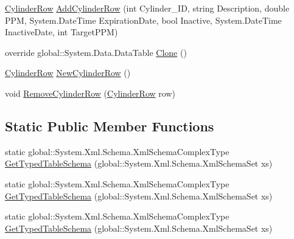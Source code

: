 \begin{DoxyCompactItemize}
\hyperlink{class_env_int_1_1_win32_1_1_field_tech_1_1_manager_1_1_data_sets_1_1_guide_ware_mobile_data_set_1_1_cylinder_row}{Cylinder\+Row} \hyperlink{class_env_int_1_1_win32_1_1_field_tech_1_1_manager_1_1_data_sets_1_1_guide_ware_mobile_data_set_1_1_cylinder_data_table_aaec1ad7d2eb796c3c432c67cb15d6db7}{Add\+Cylinder\+Row} (int Cylinder\+\_\+\+I\+D, string Description, double P\+P\+M, System.\+Date\+Time Expiration\+Date, bool Inactive, System.\+Date\+Time Inactive\+Date, int Target\+P\+P\+M)
\item 
override global\+::\+System.\+Data.\+Data\+Table \hyperlink{class_env_int_1_1_win32_1_1_field_tech_1_1_manager_1_1_data_sets_1_1_guide_ware_mobile_data_set_1_1_cylinder_data_table_acc28d7467e204bb522f9e37fc3654dd5}{Clone} ()
\item 
\hyperlink{class_env_int_1_1_win32_1_1_field_tech_1_1_manager_1_1_data_sets_1_1_guide_ware_mobile_data_set_1_1_cylinder_row}{Cylinder\+Row} \hyperlink{class_env_int_1_1_win32_1_1_field_tech_1_1_manager_1_1_data_sets_1_1_guide_ware_mobile_data_set_1_1_cylinder_data_table_aa16fd02d3df499f1b8f444e0e36027bf}{New\+Cylinder\+Row} ()
\item 
void \hyperlink{class_env_int_1_1_win32_1_1_field_tech_1_1_manager_1_1_data_sets_1_1_guide_ware_mobile_data_set_1_1_cylinder_data_table_add4d002cb111289ab667a4ee14ffeea2}{Remove\+Cylinder\+Row} (\hyperlink{class_env_int_1_1_win32_1_1_field_tech_1_1_manager_1_1_data_sets_1_1_guide_ware_mobile_data_set_1_1_cylinder_row}{Cylinder\+Row} row)
\end{DoxyCompactItemize}
\subsection*{Static Public Member Functions}
\begin{DoxyCompactItemize}
\item 
static global\+::\+System.\+Xml.\+Schema.\+Xml\+Schema\+Complex\+Type \hyperlink{class_env_int_1_1_win32_1_1_field_tech_1_1_manager_1_1_data_sets_1_1_guide_ware_mobile_data_set_1_1_cylinder_data_table_ae01b8b678e172f23a4e31cf5fbff398f}{Get\+Typed\+Table\+Schema} (global\+::\+System.\+Xml.\+Schema.\+Xml\+Schema\+Set xs)
\item 
static global\+::\+System.\+Xml.\+Schema.\+Xml\+Schema\+Complex\+Type \hyperlink{class_env_int_1_1_win32_1_1_field_tech_1_1_manager_1_1_data_sets_1_1_guide_ware_mobile_data_set_1_1_cylinder_data_table_ae01b8b678e172f23a4e31cf5fbff398f}{Get\+Typed\+Table\+Schema} (global\+::\+System.\+Xml.\+Schema.\+Xml\+Schema\+Set xs)
\item 
static global\+::\+System.\+Xml.\+Schema.\+Xml\+Schema\+Complex\+Type \hyperlink{class_env_int_1_1_win32_1_1_field_tech_1_1_manager_1_1_data_sets_1_1_guide_ware_mobile_data_set_1_1_cylinder_data_table_ae01b8b678e172f23a4e31cf5fbff398f}{Get\+Typed\+Table\+Schema} (global\+::\+System.\+Xml.\+Schema.\+Xml\+Schema\+Set xs)
\end{DoxyCompactItemize}
